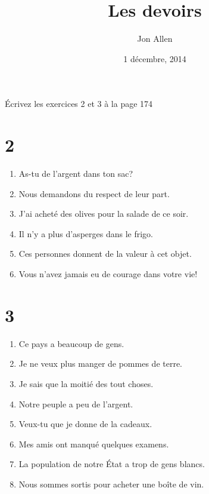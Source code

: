 \documentclass[letterpaper]{article}
\begin{document}
\title{Les devoirs}
\date{1 décembre, 2014}
\author{Jon Allen}
\maketitle
Écrivez les exercices 2 et 3 à la page 174
\section*{2}
\begin{spacing}{3.0}
\begin{enumerate}
\item
As-tu de l'argent dans ton sac?
\item
Nous demandons du respect de leur part.
\item
J'ai acheté des olives pour la salade de ce soir.
\item
Il n'y a plus d'asperges dans le frigo.
\item
Ces personnes donnent de la valeur à cet objet.
\item
Vous n'avez jamais eu de courage dans votre vie!
\end{enumerate}
\end{spacing}
\section*{3}
\begin{spacing}{3.0}
\begin{enumerate}
\item
Ce pays a beaucoup de gens.
\item
Je ne veux plus manger de pommes de terre.
\item
Je sais que la moitié des tout choses.
\item
Notre peuple a peu de l'argent.
\item
Veux-tu que je donne de la cadeaux.
\item
Mes amis ont manqué quelques examens.
\item
La population de notre État a trop de gens blancs.
\item
Nous sommes sortis pour acheter une boîte de vin.
\end{enumerate}
\end{spacing}
\end{document}

